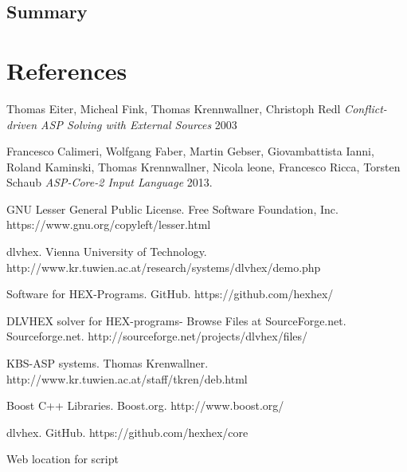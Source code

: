 \documentclass[14pt,a4paper, titlepage]{article}
\begin{document}
\subsection{Summary}

\section{References}
\begin{thebibliography}{1}
 Thomas Eiter, Micheal Fink, Thomas Krennwallner, Christoph Redl {\em Conflict-driven ASP Solving with External Sources} 2003   
  
 Francesco Calimeri, Wolfgang Faber, Martin Gebser, Giovambattista Ianni, Roland Kaminski, Thomas Krennwallner, Nicola leone, Francesco Ricca, Torsten Schaub {\em ASP-Core-2 Input Language} 2013.

 GNU Lesser General Public License. Free Software Foundation, Inc. https://www.gnu.org/copyleft/lesser.html 

dlvhex. Vienna University of Technology. http://www.kr.tuwien.ac.at/research/systems/dlvhex/demo.php 

Software for HEX-Programs. GitHub. https://github.com/hexhex/ 

DLVHEX solver for HEX-programs-  Browse Files at SourceForge.net. Sourceforge.net. http://sourceforge.net/projects/dlvhex/files/

KBS-ASP systems. Thomas Krenwallner. http://www.kr.tuwien.ac.at/staff/tkren/deb.html

Boost C++ Libraries. Boost.org. http://www.boost.org/

dlvhex. GitHub. https://github.com/hexhex/core

Web location for script
      
 
 \end{thebibliography} 
\end{document}
